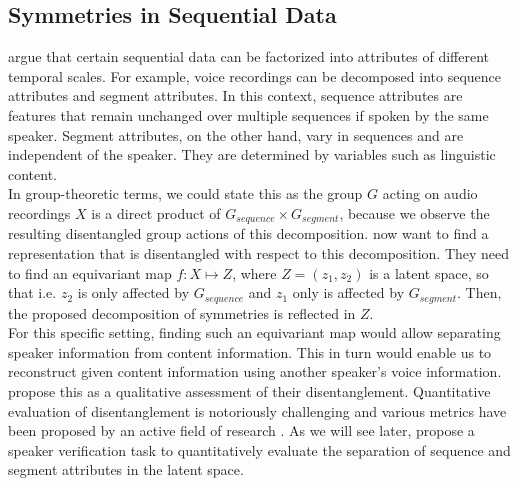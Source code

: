 \documentclass{article} %
\begin{document}
\subsection*{Symmetries in Sequential Data}
\citet{hsu2017unsupervised} argue that certain sequential data can be factorized into attributes of different temporal scales. For example, voice recordings can be decomposed into sequence attributes and segment attributes. In this context, sequence attributes are features that remain unchanged over multiple sequences if spoken by the same speaker. Segment attributes, on the other hand, vary in sequences and are independent of the speaker. They are determined by variables such as linguistic content.\\
In group-theoretic terms, we could state this as the group $G$ acting on audio recordings $X$ is a direct product of $G_{sequence} \times G_{segment}$, because we observe the resulting disentangled group actions of this decomposition. \citet{hsu2017unsupervised} now want to find a representation that is disentangled with respect to this decomposition. They need to find an equivariant map $f:X\mapsto Z$, where $Z = (z_1, z_2)$ is a latent space, so that i.e. $z_2$ is only affected by $G_{sequence}$ and $z_1$ only is affected by $G_{segment}$. Then, the proposed decomposition of symmetries is reflected in $Z$.\\
For this specific setting, finding such an equivariant map would allow separating speaker information from content information. This in turn would enable us to reconstruct given content information using another speaker's voice information. \citet{hsu2017unsupervised} propose this as a qualitative assessment of their disentanglement. Quantitative evaluation of disentanglement is notoriously challenging and various metrics have been proposed by an active field of research \cite{locatello2019challenging, higgins2016beta}. As we will see later, \citet{hsu2017unsupervised} propose a speaker verification task to quantitatively evaluate the separation of sequence and segment attributes in the latent space.
\end{document}
